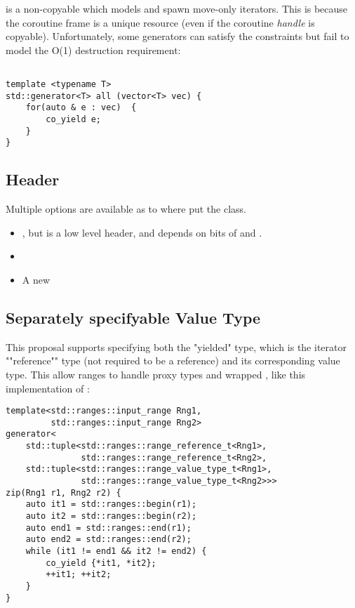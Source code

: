 \documentclass{wg21}
\begin{document}
 is a non-copyable  which models  and spawn move-only iterators.
This is because the coroutine frame is a unique resource (even if the coroutine \textit{handle} is copyable).
Unfortunately, some generators can satisfy the  constraints but fail to model the  O(1) 
destruction requirement:

\begin{lstlisting}[style=color]

template <typename T>
std::generator<T> all (vector<T> vec) {
    for(auto & e : vec)  {
        co_yield e;
    }
}

\end{lstlisting}



\subsection{Header}

Multiple options are available as to where put the  class.

\begin{itemize}
\item {}, but  is a low level header, and  depends on bits of  and .

\item {}

\item A new 

\end{itemize}

\subsection{Separately specifyable Value Type}

This proposal supports specifying both the "yielded" type, which is the iterator ""reference"" type (not required to be a reference) and its corresponding value type.
This allow ranges to handle proxy types and wrapped , like this implementation of :

\begin{lstlisting}[style=color]
template<std::ranges::input_range Rng1,
         std::ranges::input_range Rng2>
generator<
    std::tuple<std::ranges::range_reference_t<Rng1>,
               std::ranges::range_reference_t<Rng2>,
    std::tuple<std::ranges::range_value_type_t<Rng1>,
               std::ranges::range_value_type_t<Rng2>>>
zip(Rng1 r1, Rng2 r2) {
    auto it1 = std::ranges::begin(r1);
    auto it2 = std::ranges::begin(r2);
    auto end1 = std::ranges::end(r1);
    auto end2 = std::ranges::end(r2);
    while (it1 != end1 && it2 != end2) {
        co_yield {*it1, *it2};
        ++it1; ++it2;
    }
}
\end{lstlisting}
\end{document}
